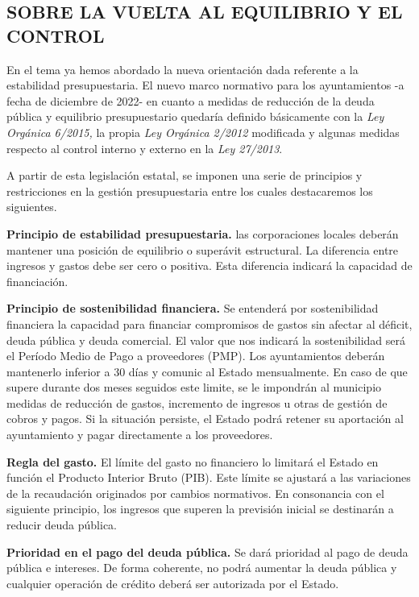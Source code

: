 \documentclass[
]{article}
\begin{document}
\hypertarget{sobre-la-vuelta-al-equilibrio-y-el-control}{%
\subsection{SOBRE LA VUELTA AL EQUILIBRIO Y EL
CONTROL}\label{sobre-la-vuelta-al-equilibrio-y-el-control}}

En el tema ya hemos abordado la nueva orientación dada referente a la
estabilidad presupuestaria. El nuevo marco normativo para los
ayuntamientos -a fecha de diciembre de 2022- en cuanto a medidas de
reducción de la deuda pública y equilibrio presupuestario quedaría
definido básicamente con la \emph{Ley Orgánica 6/2015,} la propia
\emph{Ley Orgánica 2/2012} modificada y algunas medidas respecto al
control interno y externo en la \emph{Ley 27/2013}.

A partir de esta legislación estatal, se imponen una serie de principios
y restricciones en la gestión presupuestaria entre los cuales
destacaremos los siguientes.

\textbf{Principio de estabilidad presupuestaria.} las corporaciones
locales deberán mantener una posición de equilibrio o superávit
estructural. La diferencia entre ingresos y gastos debe ser cero o
positiva. Esta diferencia indicará la capacidad de financiación.

\textbf{Principio de sostenibilidad financiera.} Se entenderá por
sostenibilidad financiera la capacidad para financiar compromisos de
gastos sin afectar al déficit, deuda pública y deuda comercial. El valor
que nos indicará la sostenibilidad será el Período Medio de Pago a
proveedores (PMP). Los ayuntamientos deberán mantenerlo inferior a 30
días y comunic al Estado mensualmente. En caso de que supere durante dos
meses seguidos este limite, se le impondrán al municipio medidas de
reducción de gastos, incremento de ingresos u otras de gestión de cobros
y pagos. Si la situación persiste, el Estado podrá retener su aportación
al ayuntamiento y pagar directamente a los proveedores.

\textbf{Regla del gasto.} El límite del gasto no financiero lo limitará
el Estado en función el Producto Interior Bruto (PIB). Este límite se
ajustará a las variaciones de la recaudación originados por cambios
normativos. En consonancia con el siguiente principio, los ingresos que
superen la previsión inicial se destinarán a reducir deuda pública.

\textbf{Prioridad en el pago del deuda pública.} Se dará prioridad al
pago de deuda pública e intereses. De forma coherente, no podrá aumentar
la deuda pública y cualquier operación de crédito deberá ser autorizada
por el Estado.
\end{document}
